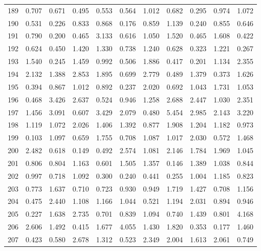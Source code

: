 \begin{tabular}{lrrrrrrrrrr}
189 &  0.707 &  0.671 &  0.495 &  0.553 &  0.564 &  1.012 &  0.682 &  0.295 &  0.974 &  1.072 \\
190 &  0.531 &  0.226 &  0.833 &  0.868 &  0.176 &  0.859 &  1.139 &  0.240 &  0.855 &  0.646 \\
191 &  0.790 &  0.200 &  0.465 &  3.133 &  0.616 &  1.050 &  1.520 &  0.465 &  1.608 &  0.422 \\
192 &  0.624 &  0.450 &  1.420 &  1.330 &  0.738 &  1.240 &  0.628 &  0.323 &  1.221 &  0.267 \\
193 &  1.540 &  0.245 &  1.459 &  0.992 &  0.506 &  1.886 &  0.417 &  0.201 &  1.134 &  2.355 \\
194 &  2.132 &  1.388 &  2.853 &  1.895 &  0.699 &  2.779 &  0.489 &  1.379 &  0.373 &  1.626 \\
195 &  0.394 &  0.867 &  1.012 &  0.892 &  0.237 &  2.020 &  0.692 &  1.043 &  1.731 &  1.053 \\
196 &  0.468 &  3.426 &  2.637 &  0.524 &  0.946 &  1.258 &  2.688 &  2.447 &  1.030 &  2.351 \\
197 &  1.456 &  3.091 &  0.607 &  3.429 &  2.079 &  0.480 &  5.454 &  2.985 &  2.143 &  3.220 \\
198 &  1.119 &  1.072 &  2.026 &  1.406 &  1.392 &  0.877 &  1.908 &  1.204 &  1.182 &  0.973 \\
199 &  0.103 &  1.097 &  0.659 &  1.755 &  0.708 &  1.087 &  1.017 &  2.030 &  0.572 &  1.468 \\
200 &  2.482 &  0.618 &  0.149 &  0.492 &  2.574 &  1.081 &  2.146 &  1.784 &  1.969 &  1.045 \\
201 &  0.806 &  0.804 &  1.163 &  0.601 &  1.505 &  1.357 &  0.146 &  1.389 &  1.038 &  0.844 \\
202 &  0.997 &  0.718 &  1.092 &  0.300 &  0.240 &  0.441 &  0.255 &  1.004 &  1.185 &  0.823 \\
203 &  0.773 &  1.637 &  0.710 &  0.723 &  0.930 &  0.949 &  1.719 &  1.427 &  0.708 &  1.156 \\
204 &  0.475 &  2.440 &  1.108 &  1.166 &  1.044 &  0.521 &  1.194 &  2.031 &  0.894 &  0.946 \\
205 &  0.227 &  1.638 &  2.735 &  0.701 &  0.839 &  1.094 &  0.740 &  1.439 &  0.801 &  4.168 \\
206 &  2.606 &  1.492 &  0.415 &  1.677 &  4.055 &  1.430 &  1.820 &  0.353 &  0.177 &  1.460 \\
207 &  0.423 &  0.580 &  2.678 &  1.312 &  0.523 &  2.349 &  2.004 &  1.613 &  2.061 &  0.749 \\

\end{tabular}
